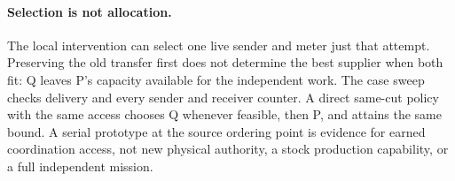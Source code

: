 \documentclass{article}
\begin{document}
\paragraph{Selection is not allocation.}
The local intervention can select one live sender and meter just
that attempt. Preserving the old transfer first does not determine
the best supplier when both fit: Q leaves P's capacity available
for the independent work. The case sweep checks delivery and every
sender and receiver counter. A direct same-cut policy with the
same access chooses Q whenever feasible, then P, and attains the
same bound. A serial prototype at the source ordering point is
evidence for earned coordination access, not new physical authority,
a stock production capability, or a full independent mission.
\end{document}
